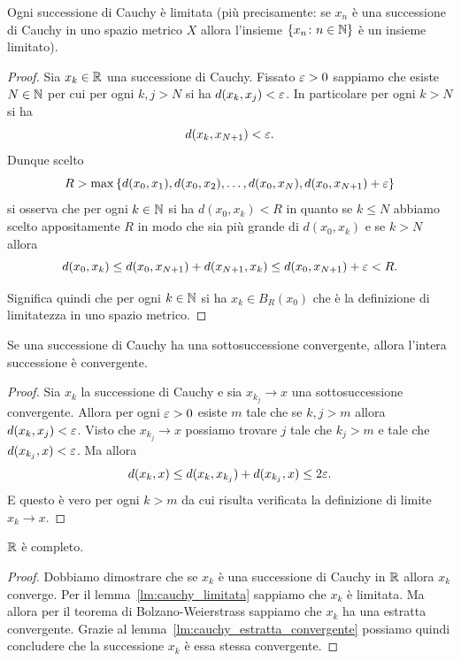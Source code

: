 \begin{lemma}
\label{lm:cauchy_limitata}
Ogni successione di Cauchy è limitata
(più precisamente: se $x_n$ è una successione di Cauchy in uno spazio metrico $X$ allora l'insieme ${\left\{ x_n\colon n\in {\mathbb N} \right\}}$
è un insieme limitato).
\end{lemma}
%
\begin{proof}
Sia $x_k \in {\mathbb R}$ una successione di Cauchy.
Fissato $\varepsilon>0$ sappiamo che esiste $N\in {\mathbb N}$
per cui per ogni $k,j>N$ si ha
$d(x_k,x_j) < \varepsilon$. 
In particolare per ogni $k>N$ si ha
\[
  d(x_k, x_{N+1}) < \varepsilon.
\]
Dunque scelto
\[
  R > \max{\left\{ d(x_0,x_1), d(x_0,x_2), \dots, d(x_0,x_N), d(x_0, x_{N+1}) + \varepsilon\right\}}
\]
si osserva che per ogni $k\in {\mathbb N}$ si ha $d(x_0, x_k)< R$ in quanto 
se $k \le N$ abbiamo scelto appositamente $R$ in modo che sia più grande di $d(x_0,x_k)$ e se $k > N$ allora
\[
  d(x_0,x_k) \le d(x_0,x_{N+1}) + d(x_{N+1},x_k)
    \le d(x_0,x_{N+1}) + \varepsilon < R.
\]

Significa quindi che per ogni $k\in {\mathbb N}$ si ha $x_k \in B_{R}(x_0)$ 
che è la definizione di limitatezza in uno
spazio metrico.
\end{proof}

\begin{lemma}
\label{lm:cauchy_estratta_convergente}
Se una successione di Cauchy ha una sottosuccessione convergente, allora l'intera successione è convergente.
\end{lemma}
%
\begin{proof}
Sia $x_k$ la successione di Cauchy e sia $x_{k_j}\to x$ una  sottosuccessione convergente.
Allora per ogni $\varepsilon>0$
esiste $m$ tale che se $k,j>m$ allora $d(x_k ,x_j) < \varepsilon$.
Visto che $x_{k_j} \to x$ possiamo trovare $j$ tale che $k_j > m$ e tale che $d(x_{k_j},x) < \varepsilon$. Ma allora
\[
  d(x_k,x) \le d(x_k, x_{k_j}) + d(x_{k_j},x)
   \le 2 \varepsilon.
\]
E questo è vero per ogni $k > m$ da cui risulta verificata la definizione di limite $x_k \to x$.
\end{proof}

\begin{theorem}[completezza di $\RR$]
\mymark{***}%
%
%
\label{th:R-completo}%
$\RR$ è completo.
\end{theorem}
%
\begin{proof}
\mymark{***}
Dobbiamo dimostrare che se $x_k$ è una successione di Cauchy in $\RR$ allora $x_k$ converge.
Per il lemma~\ref{lm:cauchy_limitata} sappiamo che $x_k$ è limitata.
Ma allora per il teorema di Bolzano-Weierstrass sappiamo che $x_k$ ha
una estratta convergente.
Grazie al lemma~\ref{lm:cauchy_estratta_convergente} possiamo quindi concludere
che la successione $x_k$ è essa stessa convergente.
\end{proof}

